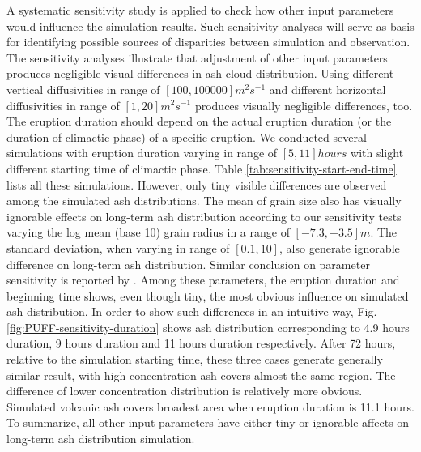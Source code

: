 A systematic sensitivity study is applied to check how other input parameters would influence the simulation results. Such sensitivity analyses will serve as basis for identifying possible sources of disparities between simulation and observation.
The sensitivity analyses illustrate that adjustment of other input parameters produces negligible visual differences in ash cloud distribution. Using different vertical diffusivities in range of $[100, 100000] m^2s^{-1} $ and different horizontal diffusivities in range of $[1, 20] m^2s^{-1}$ produces visually negligible differences, too. 
The eruption duration should depend on the actual eruption duration (or the duration of climactic phase) of a specific eruption. We conducted several simulations with eruption duration varying in range of $[5, 11] hours$ with slight different starting time of climactic phase. Table \ref{tab:sensitivity-start-end-time} lists all these simulations. However, only tiny visible differences are observed among the simulated ash distributions. The mean of grain size also has visually ignorable effects on long-term ash distribution according to our sensitivity tests varying the log mean (base 10) grain radius in a range of $[-7.3, -3.5] m$. 
The standard deviation, when varying in range of $[0.1, 10]$, also generate ignorable difference on long-term ash distribution. Similar conclusion on parameter sensitivity is reported by \citet{fero2008simulation}.
Among these parameters, the eruption duration and beginning time shows, even though tiny, the most obvious influence on simulated ash distribution. In order to show such differences in an intuitive way, Fig. \ref{fig:PUFF-sensitivity-duration} shows ash distribution corresponding to 4.9 hours duration, 9 hours duration and 11 hours duration respectively. After 72 hours, relative to the simulation starting time, these three cases generate generally similar result, with high concentration ash covers almost the same region. The difference of lower concentration distribution is relatively more obvious. Simulated volcanic ash covers broadest area when eruption duration is 11.1 hours. To summarize, all other input parameters have either tiny or ignorable affects on long-term ash distribution simulation. 

